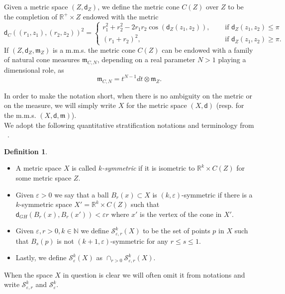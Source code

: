 \documentclass[a4paper]{amsart}
\theoremstyle{plain}
\theoremstyle{definition}
\newtheorem{definition}[lemma]{Definition}
\numberwithin{equation}{section}
\newcommand{\R}{\mathbb{R}}
\newcommand{\N}{\mathbb{N}}
\renewcommand{\S}{\mathcal{S}}
\newcommand{\mm}{\mathfrak m}
\newcommand{\sfd}{\mathsf d}
\newcommand{\eps}{\varepsilon}
\begin{document}
{ Given a metric space $(Z,\sfd_{Z})$, we define the metric cone $C(Z)$  over $Z$ to be the completion of $\R^{+}\times Z$ endowed with the metric
\begin{equation}\label{eq:defConeDist}
\sfd_{C}((r_{1},z_{1}), (r_{2},z_{2}))^{2}= 
\begin{cases}
r_{1}^{2}+r_{2}^{2}-2 r_{1}r_{2} \cos(\sfd_{Z}(z_{1},z_{2})), &\quad \text{ if } \sfd_{Z}(z_{1},z_{2})\leq \pi \\
(r_{1}+r_{2})^{2}, & \quad \text{ if } \sfd_{Z}(z_{1},z_{2})\geq \pi.
\end{cases}
\end{equation}
If $(Z,\sfd_{Z},\mm_{Z})$ is a m.m.s. the metric cone  $C(Z)$ can be endowed with a family of natural cone measures $\mm_{C,N}$, depending on a real parameter $N>1$ playing a dimensional role, as 
\begin{equation}\label{eq:ConeMeas}
\mm_{C,N}=t^{N-1} dt \otimes \mm_{Z}. 
\end{equation}


In order to make the notation short, when there is no ambiguity on the metric or on the measure, we will simply write $X$ for the metric space $(X,\sfd)$ (resp. for the m.m.s. $(X,\sfd,\mm)$).
\\We adopt the following quantitative stratification notations and terminology from ~\cite{cheeger-jiang-naber-18}.
\begin{definition} $\quad$
\begin{itemize}
\item A metric space $X$ is called \emph{$k$-symmetric} if it is isometric to $\R^k\times C(Z)$  for some metric space $Z$. 
\item Given $\eps >0$ we say that a ball $B_r(x)\subset X$ is $(k,\eps)$-symmetric if there is a $k$-symmetric space $X'=\R^k\times C(Z)$ such that $\sfd_{GH}(B_r(x), B_r(x'))<\eps r$ where $x'$ is the vertex of the cone in $X'$.
\item  Given $\eps, r>0, k\in \N$ we define $\S_{\eps,r}^k(X)$ to be the set of points $p$ in $X$ such that $B_s(p)$ is not $(k+1,\eps)$-symmetric for any $r\le s\le 1$.
\item Lastly, we define $\S_\eps^k(X)$ as $\cap_{r>0}\S_{\eps,r}^k(X)$.
\end{itemize}
When the space $X$ in question is clear we will often omit it from notations and write $\S_{\eps,r}^k$ and $\S_\eps^k$. 
\end{definition}

{

}}
\end{document}
